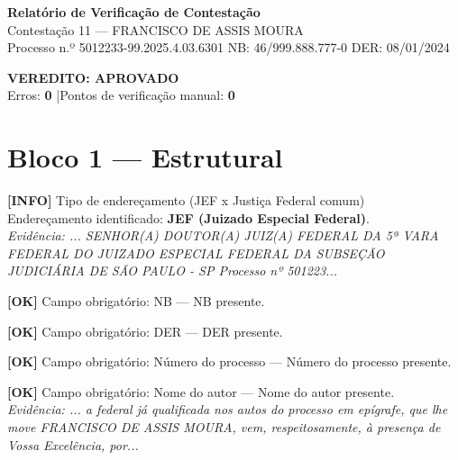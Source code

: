 \documentclass[12pt,a4paper]{article}
\newcommand{\statusOK}[1]{\textcolor{corOK}{\textbf{[OK]}} #1}
\newcommand{\statusINFO}[1]{\textcolor{corINFO}{\textbf{[INFO]}} #1}
\begin{document}
\begin{center}
  {\LARGE \textbf{Relatório de Verificação de Contestação}}\\[0.4em]
  {\large Contestação 11 --- FRANCISCO DE ASSIS MOURA}\\[0.2em]
  {\small Processo n.º 5012233-99.2025.4.03.6301 \quad NB: 46/999.888.777-0 \quad DER: 08/01/2024}
\end{center}

\vspace{0.5em}

\noindent\colorbox{corFundoAprovado}{%
  \begin{minipage}{\dimexpr\linewidth-2\fboxsep}
    \centering
    \vspace{0.3em}
    {\large \textcolor{corOK}{\textbf{VEREDITO: APROVADO}}}\\
    Erros: \textbf{0} \quad|\quad Pontos de verificação manual: \textbf{0}
    \vspace{0.3em}
  \end{minipage}%
}

\vspace{1em}


\section{Bloco 1 --- Estrutural}

\statusINFO{Tipo de endereçamento (JEF x Justiça Federal comum)}\\
Endereçamento identificado: \textbf{JEF (Juizado Especial Federal)}.\\
\textit{Evidência: ... SENHOR(A) DOUTOR(A) JUIZ(A) FEDERAL DA 5ª VARA FEDERAL DO JUIZADO ESPECIAL FEDERAL DA SUBSEÇÃO JUDICIÁRIA DE SÃO PAULO - SP Processo nº 501223...}

\medskip
\statusOK{Campo obrigatório: NB} --- NB presente.

\medskip
\statusOK{Campo obrigatório: DER} --- DER presente.

\medskip
\statusOK{Campo obrigatório: Número do processo} --- Número do processo presente.

\medskip
\statusOK{Campo obrigatório: Nome do autor} --- Nome do autor presente.\\
\textit{Evidência: ... a federal já qualificada nos autos do processo em epígrafe, que lhe move FRANCISCO DE ASSIS MOURA, vem, respeitosamente, à presença de Vossa Excelência, por...}
\end{document}
